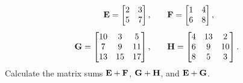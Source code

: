 \documentclass[a4paper,oneside,12pt]{article}
\begin{document}
\begin{problem}
\begin{packedenum}
\begin{equation}
    \label{eqn:quadratic_applications:matrices_for_sum_product}
    \begin{aligned}
    \textbf{E}
    =
    \begin{bmatrix}
    2 & 3 \\
    5 & 7
    \end{bmatrix},
    &\qquad
    \textbf{F}
    =
    \begin{bmatrix}
    1 & 4 \\
    6 & 8
    \end{bmatrix}, \\[4pt]
    \textbf{G}
    =
    \begin{bmatrix}
    10 & 3  & 5  \\
    7  & 9  & 11 \\
    13 & 15 & 17
    \end{bmatrix},
    &\qquad
    \textbf{H}
    =
    \begin{bmatrix}
    4 & 13 & 2  \\
    6 & 9  & 10 \\
    8 & 5  & 3
    \end{bmatrix}.
    \end{aligned}
    \end{equation}
    Calculate the matrix sums $\textbf{E} + \textbf{F}$, $\textbf{G} + \textbf{H}$, and
    $\textbf{E} + \textbf{G}$.


\end{packedenum}
\end{problem}
\end{document}
